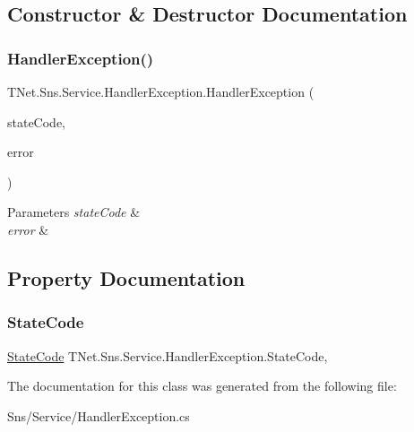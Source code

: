 \subsection{Constructor \& Destructor Documentation}
\mbox{\label{class_t_net_1_1_sns_1_1_service_1_1_handler_exception_a19cbc89615fbfd2bef6b448a8b8da05a}} 
\subsubsection{\texorpdfstring{Handler\+Exception()}{HandlerException()}}
{\footnotesize\ttfamily T\+Net.\+Sns.\+Service.\+Handler\+Exception.\+Handler\+Exception (\begin{DoxyParamCaption}\item[{\mbox{\hyperlink{namespace_t_net_1_1_sns_1_1_service_ab93c34900ebc0ee83129c9ccab1e4bd8}{State\+Code}}}]{state\+Code,  }\item[{string}]{error }\end{DoxyParamCaption})}






\begin{DoxyParams}{Parameters}
{\em state\+Code} & \\
\hline
{\em error} & \\
\hline
\end{DoxyParams}


\subsection{Property Documentation}
\mbox{\label{class_t_net_1_1_sns_1_1_service_1_1_handler_exception_ae41ef5790dcb8c2684c25f44795e2c1d}} 
\subsubsection{\texorpdfstring{State\+Code}{StateCode}}
{\footnotesize\ttfamily \mbox{\hyperlink{namespace_t_net_1_1_sns_1_1_service_ab93c34900ebc0ee83129c9ccab1e4bd8}{State\+Code}} T\+Net.\+Sns.\+Service.\+Handler\+Exception.\+State\+Code\hspace{0.3cm}{\ttfamily [get]}, {\ttfamily [set]}}







The documentation for this class was generated from the following file\+:\begin{DoxyCompactItemize}
\item 
Sns/\+Service/Handler\+Exception.\+cs\end{DoxyCompactItemize}
